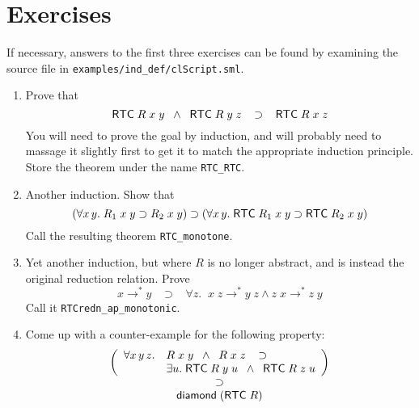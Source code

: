 \section{Exercises}

If necessary, answers to the first three exercises can be found by
examining the source file in \texttt{examples/ind\_def/clScript.sml}.

\begin{enumerate}
\item Prove that \[{\sf RTC}\;R \;x\; y \;\;\land \;\;
  {\sf RTC}\;R\;y\;z\;\;\;\supset\;\;\; {\sf RTC}\;R\;x\;z
\] You will need to prove the goal by induction, and will probably
  need to massage it slightly first to get it to match the appropriate
  induction principle.  Store the theorem under the name
  \texttt{RTC\_RTC}.
\item Another induction.  Show that \[
  (\forall x\,y.\; R_1\;x\;y\supset R_2\;x\;y) \supset
  (\forall x\,y.\; {\sf RTC}\;R_1\;x\;y \supset {\sf RTC}\;R_2\;x\;y)
\] Call the resulting theorem \texttt{RTC\_monotone}.
\item Yet another  induction, but where $R$ is no longer
  abstract, and is instead the original reduction relation.  Prove
\[
x \rightarrow^* y \;\;\;\supset\;\;\;
\forall z.\;\; x\;z \rightarrow^* y \;z \land
z\;x \rightarrow^* z\;y
\] Call it \texttt{RTCredn\_ap\_monotonic}.


\item Come up with a counter-example for the following property: \[
\begin{array}{c}
  \left(
    \begin{array}{ll}
      \forall x\,y\,z. &
      R\;x\;y\;\;\land\;\; R\;x\;z \;\;\;\supset\\
      & \exists u.\;{\sf RTC}\;R\;y\;u \;\;\land\;\;{\sf RTC}\;R\;z\;u
      \end{array}\right)\\
    \supset\\
    {\sf diamond}\;({\sf RTC}\;R)
  \end{array}
  \]
\end{enumerate}

